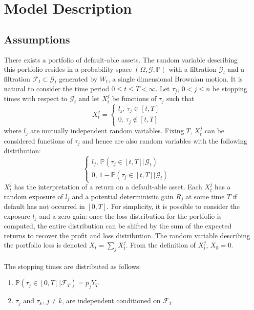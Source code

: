 \documentclass[12pt]{article}
\theoremstyle{definition}
\begin{document}
\section{Model Description}
\subsection{Assumptions}
There exists a portfolio of default-able assets.  The random variable describing this portfolio resides in a probability space \((\Omega, \mathcal{G}, \mathbb{P})\) with a filtration \(\mathcal{G}_t\) and a filtration \(\mathcal{F}_t \subset \mathcal{G}_t\) generated by \(W_t\), a single dimensional Brownian motion.  It is natural to consider the time period \(0\leq t \leq T < \infty\).  Let \(\tau_j,\,0<j\leq n\) be stopping times with respect to \(\mathcal{G}_t\) and let \(X_t ^ j\) be functions of \(\tau_j\) such that
\begin{equation}X_t ^ j=\begin{cases} l_j,\,\tau_j \in [t, T] \\ 0,\,\tau_j \not\in [t, T] \end{cases}\end{equation}
where \(l_j\) are mutually independent random variables.  Fixing \(T\), \(X_t ^j\) can be considered functions of \(\tau_j\) and hence are also random variables with the following distribution:
\begin{equation}\begin{cases} l_j,\, \mathbb{P}(\tau_j \in [t, T]|\mathcal{G}_t) \\ 0,\,1-\mathbb{P}(\tau_j \in [t, T] | \mathcal{G}_t)\end{cases}\end{equation}
\(X_t ^j\) has the interpretation of a return on a default-able asset.  Each \(X_t ^ j\) has a random exposure of \(l_j\) and a potential deterministic gain \(R_j\) at some time \(T\) if default has not occurred in \([0, T]\).  For simplicity, it is possible to consider the exposure \(l_j\) and a zero gain: once the loss distribution for the portfolio is computed, the entire distribution can be shifted by the sum of the expected returns to recover the profit and loss distribution.   The random variable describing the portfolio loss is denoted \(X_t=\sum_j X_t ^ j\).  From the definition of \(X_t ^j\), \(X_0 = 0\). 
\\
\\
The stopping times are distributed as follows:
\begin{enumerate}
\item
\( \mathbb{P}(\tau_j \in [0, T]|\mathcal{F}_T)=p_j Y_T \)
\item \(\tau_j\) and \(\tau_k\), \(j \neq k\), are independent conditioned on \(\mathcal{F}_T\)
\end{enumerate}
\end{document}
